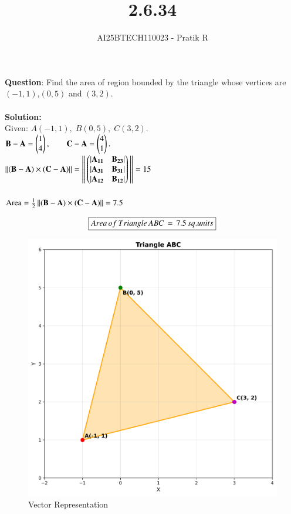 \documentclass[journal]{IEEEtran}
\begin{document}

\vspace{3cm}

\title{2.6.34}
\author{AI25BTECH110023 - Pratik R}
{\let\newpage\relax\maketitle}

\renewcommand{\thefigure}{\theenumi}
\renewcommand{\thetable}{\theenumi}
\setlength{\intextsep}{10pt} 


\renewcommand{\thetable}{\theenumi}


\textbf{Question}: Find the area of region bounded by the triangle whose vertices are $(-1, 1)$,$(0, 5)$ and
$(3, 2)$.\\\\

\textbf{Solution:}\\
Given: $A(-1,1),\; B(0,5),\; C(3,2).$\\

$
\mathbf{B}-\mathbf{A} =\begin{pmatrix}1\\4\end{pmatrix},\qquad
\mathbf{C}-\mathbf{A} = \begin{pmatrix}4\\1\end{pmatrix}.
$\\

$\left\lVert\mathbf{(B-A)} \times \mathbf{(C-A)}\right\rVert = \left\lVert\,\begin{pmatrix}|\mathbf{A_{11}} & \mathbf{B_{23}}| \\ |\mathbf{A_{31}} & \mathbf{B_{31}}| \\ |\mathbf{A_{12}} & \mathbf{B_{12}}|\end{pmatrix}\,\right\rVert = 15 $\\\\


$
\text{Area}=\frac{1}{2}\left\lVert\mathbf{(B-A)} \times \mathbf{(C-A)}\right\rVert = 7.5
$

\begin{align}
    \centering
    \boxed{Area \, of \, Triangle \, ABC \,= \,7.5\,sq.units}
\end{align}
\bigskip

\begin{figure}[htbp]
    \centering
    \includegraphics[width=0.65\linewidth]{figs/fig.png}
    \caption{Vector Representation}
    \label{fig:fig/fig1.png}
\end{figure}
\end{document}
